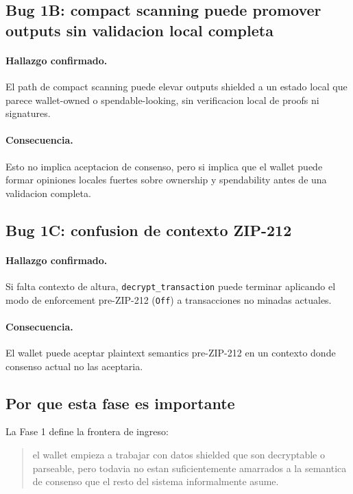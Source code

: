 \documentclass[11pt,a4paper]{article}
\begin{document}
\subsection{Bug 1B: compact scanning puede promover outputs sin validacion local completa}

\paragraph{Hallazgo confirmado.}
El path de compact scanning puede elevar outputs shielded a un estado local
que parece wallet-owned o spendable-looking, sin verificacion local de proofs
ni signatures.

\paragraph{Consecuencia.}
Esto no implica aceptacion de consenso, pero si implica que el wallet puede
formar opiniones locales fuertes sobre ownership y spendability antes de una
validacion completa.

\subsection{Bug 1C: confusion de contexto ZIP-212}

\paragraph{Hallazgo confirmado.}
Si falta contexto de altura, \texttt{decrypt\_transaction} puede terminar
aplicando el modo de enforcement pre-ZIP-212 (\texttt{Off}) a transacciones no
minadas actuales.

\paragraph{Consecuencia.}
El wallet puede aceptar plaintext semantics pre-ZIP-212 en un contexto donde
consenso actual no las aceptaria.

\subsection{Por que esta fase es importante}

La Fase 1 define la frontera de ingreso:

\begin{quote}
el wallet empieza a trabajar con datos shielded que son decryptable o
parseable, pero todavia no estan suficientemente amarrados a la semantica de
consenso que el resto del sistema informalmente asume.
\end{quote}
\end{document}
